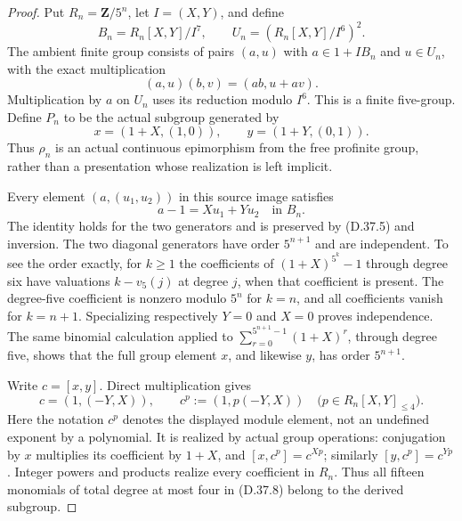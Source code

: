 \begin{proof}
Put \(R_n=\mathbf Z/5^n\), let \(I=(X,Y)\), and define
\[
 B_n=R_n[X,Y]/I^7,\qquad
 U_n=(R_n[X,Y]/I^6)^2.
 \tag{D.37.4}
\]
The ambient finite group consists of pairs \((a,u)\) with
\(a\in1+I B_n\) and \(u\in U_n\), with the exact multiplication
\[
              (a,u)(b,v)=(ab,u+av).
 \tag{D.37.5}
\]
Multiplication by \(a\) on \(U_n\) uses its reduction modulo
\(I^6\).  This is a finite five-group.
Define \(P_n\) to be the actual subgroup generated by
\[
 x=(1+X,(1,0)),\qquad
 y=(1+Y,(0,1)).
 \tag{D.37.6}
\]
Thus \(\rho_n\) is an actual continuous epimorphism from
the free profinite group, rather than a presentation whose
realization is left implicit.

Every element \((a,(u_1,u_2))\) in this source image satisfies
\[
                         a-1=Xu_1+Yu_2
                         \quad\text{in }B_n.
 \tag{D.37.7}
\]
The identity holds for the two generators and is preserved
by \textup{(D.37.5)} and inversion.
The two diagonal generators have order \(5^{n+1}\) and
are independent.  To see the order exactly, for \(k\geq1\)
the coefficients of
\((1+X)^{5^k}-1\) through degree six have valuations
\(k-v_5(j)\) at degree \(j\), when that coefficient is
present.  The degree-five coefficient is nonzero modulo
\(5^n\) for \(k=n\), and all coefficients vanish for
\(k=n+1\).  Specializing respectively \(Y=0\) and
\(X=0\) proves independence.
The same binomial calculation applied to
\(\sum_{r=0}^{5^{n+1}-1}(1+X)^r\), through degree five,
shows that the full group element \(x\), and likewise
\(y\), has order \(5^{n+1}\).

Write \(c=[x,y]\).  Direct multiplication gives
\[
            c=(1,(-Y,X)),\qquad
 c^p:=(1,p(-Y,X))
       \quad\bigl(p\in R_n[X,Y]_{\leq4}\bigr).
 \tag{D.37.8}
\]
Here the notation \(c^p\) denotes the displayed module
element, not an undefined exponent by a polynomial.
It is realized by actual group operations: conjugation
by \(x\) multiplies its coefficient by \(1+X\), and
\([x,c^p]=c^{Xp}\); similarly \([y,c^p]=c^{Yp}\).
Integer powers and products realize every coefficient
in \(R_n\).  Thus all fifteen monomials of total degree
at most four in \textup{(D.37.8)} belong to the derived
subgroup.


\end{proof}
